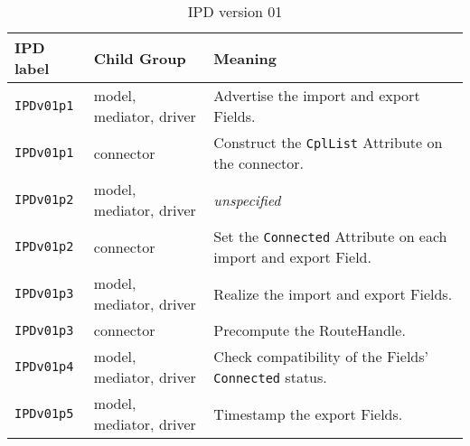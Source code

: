 \begin{table}[h]
\begin{tabular}{|p{5cm}|p{5cm}|p{35mm}|}
     \hline\hline
     {\bf IPD label} & {\bf Child Group} & {\bf Meaning}\\
     \hline\hline
     {\tt IPDv01p1} & model, mediator, driver & Advertise the import and export Fields.\\ \hline
     {\tt IPDv01p1} & connector               & Construct the {\tt CplList} Attribute on the connector.\\ \hline
     {\tt IPDv01p2} & model, mediator, driver & {\em unspecified}\\ \hline
     {\tt IPDv01p2} & connector               & Set the {\tt Connected} Attribute on each import and export Field.\\ \hline
     {\tt IPDv01p3} & model, mediator, driver & Realize the import and export Fields.\\ \hline
     {\tt IPDv01p3} & connector               & Precompute the RouteHandle.\\ \hline
     {\tt IPDv01p4} & model, mediator, driver & Check compatibility of the Fields' {\tt Connected} status.\\ \hline
     {\tt IPDv01p5} & model, mediator, driver & Timestamp the export Fields.\\
     \hline\hline
\end{tabular}
\caption{IPD version 01}
\label{table:IPDv01}
\end{table}
